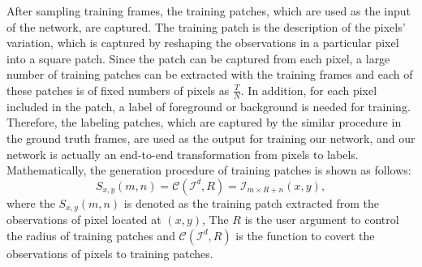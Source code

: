 \documentclass[journal]{IEEEtran}
\begin{document}
After sampling training frames,
the training patches, which are used as the input of the network, are captured.
%
The training patch is the description of the pixels' variation,
which is captured by reshaping the observations in a particular pixel into a square patch.
%
Since the patch can be captured from each pixel, 
a large number of training patches can be extracted with the training frames
and each of these patches is of fixed numbers of pixels as $\frac{T}{N}$.
%
In addition, for each pixel included in the patch, a label of foreground or background is needed for training.
%
Therefore,
the labeling patches, which are captured by the similar procedure in the ground truth frames,
are used as the output for training our network,
and our network is actually an end-to-end transformation from pixels to labels.
%
Mathematically, the generation procedure of training patches is shown as follows:
\begin{equation}
    S_{x,y}(m,n) = \mathcal{C}(\mathcal{I}^d, R) = \mathcal{I}_{m \times R + n} (x,y),
\end{equation}
where the $S_{x,y}(m,n)$ is denoted as the training patch extracted from the observations of pixel located at $(x,y)$,
The $R$ is the user argument to control the radius of training patches
and $\mathcal{C}(\mathcal{I}^d, R)$ is the function to covert the observations of pixels to training patches.
% 
% 
% 
% 
% 
% 
% 
% 
% 
% 
% 
\end{document}
